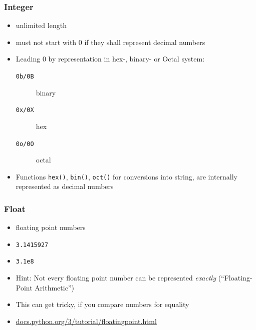 \documentclass[english]{beamer}
\begin{document}
\begin{frame}
\frametitle{Integer}

\begin{itemize}
\item unlimited length
\item must not start with 0 if they shall represent decimal numbers 
\item Leading 0 by representation in hex-, binary- or Octal system:
\begin{description}
\item[\texttt{0b/0B}] binary
\item[\texttt{0x/0X}] hex
\item[\texttt{0o/0O}] octal
\end{description}
\item Functions \texttt{hex()}, \texttt{bin()}, \texttt{oct()} for conversions into string, are internally represented as decimal numbers 
\end{itemize}
\end{frame}

\begin{frame}
\frametitle{Float}

\begin{itemize}
	\item floating point numbers
	\item \texttt{3.1415927}
	\item \texttt{3.1e8}
	\item Hint: Not every floating point number can be represented \textit{exactly} (\enquote{Floating-Point Arithmetic}) 
	\item This can get tricky, if you compare numbers for equality
	\item \url{docs.python.org/3/tutorial/floatingpoint.html}

\end{itemize}
\end{frame}
\end{document}
